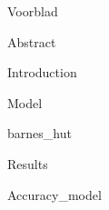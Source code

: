 \documentclass{article}
\begin{document}
{Voorblad}
\newpage

\tableofcontents
\newpage

{Abstract}
\newpage

{Introduction}
\newpage

{Model}
\newpage
 
{barnes_hut}
\newpage

{Results}
\newpage

{Accuracy_model}
\newpage


\newpage


\newpage


\end{document}
